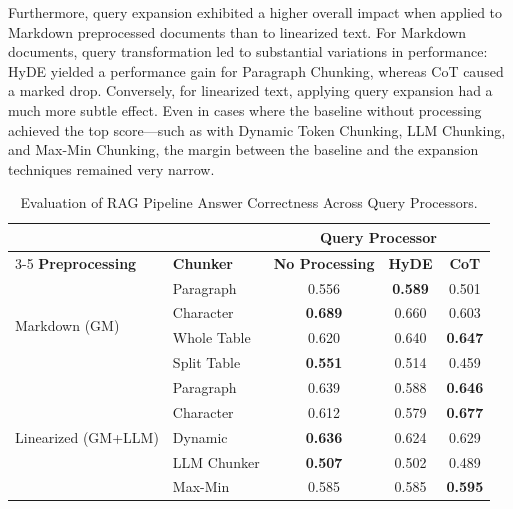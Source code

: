 \documentclass[12pt]{article} %
\begin{document}
Furthermore, query expansion exhibited a higher overall impact when applied to Markdown preprocessed documents than to linearized text. For Markdown documents, query transformation led to substantial variations in performance: HyDE yielded a performance gain for Paragraph Chunking, whereas CoT caused a marked drop. Conversely, for linearized text, applying query expansion had a much more subtle effect. Even in cases where the baseline without processing achieved the top score—such as with Dynamic Token Chunking, LLM Chunking, and Max-Min Chunking, the margin between the baseline and the expansion techniques remained very narrow.
\begin{table}[htbp]
    \centering
    \small
    \setlength{\tabcolsep}{8pt}
    \renewcommand{\arraystretch}{1.1}
    \caption{Evaluation of RAG Pipeline Answer Correctness Across Query Processors.}
    \label{tab:query_processor_eval_compact}
    \begin{tabular}{llccc}
        \toprule
                               &                  & \multicolumn{3}{c}{\textbf{Query Processor}}                                   \\
        \cmidrule(lr){3-5}
        \textbf{Preprocessing} & \textbf{Chunker} & \textbf{No Processing}                       & \textbf{HyDE}  & \textbf{CoT}   \\
        \midrule
        \multirow{4}{*}{Markdown (GM)}
                               & Paragraph        & 0.556                                        & \textbf{0.589} & 0.501          \\
                               & Character        & \textbf{0.689}                               & 0.660          & 0.603          \\
                               & Whole Table      & 0.620                                        & 0.640          & \textbf{0.647} \\
                               & Split Table      & \textbf{0.551}                               & 0.514          & 0.459          \\
        \midrule
        \multirow{5}{*}{Linearized (GM+LLM)}
                               & Paragraph        & 0.639                                        & 0.588          & \textbf{0.646} \\
                               & Character        & 0.612                                        & 0.579          & \textbf{0.677} \\
                               & Dynamic          & \textbf{0.636}                               & 0.624          & 0.629          \\
                               & LLM Chunker      & \textbf{0.507}                               & 0.502          & 0.489          \\
                               & Max-Min          & 0.585                                        & 0.585          & \textbf{0.595} \\
        \bottomrule
    \end{tabular}
\end{table}
\FloatBarrier
\end{document}
